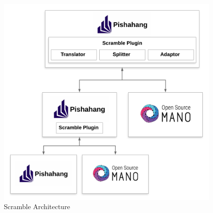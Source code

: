 \begin{figure}[h]
	\centering
	\includegraphics[width=0.9\linewidth]{../figures/ScrambleArch}
	\caption{Scramble Architecture}
	\label{fig:scramble-arch}
\end{figure}

